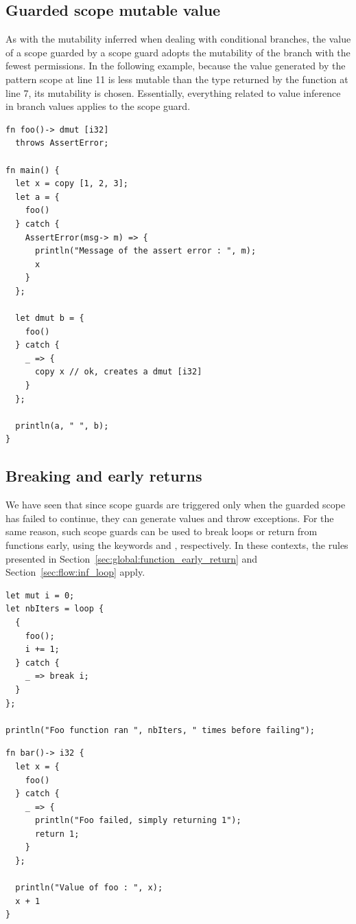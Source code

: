 \subsection{Guarded scope mutable value}

As with the mutability inferred when dealing with conditional branches, the
value of a scope guarded by a  scope guard adopts the mutability of
the branch with the fewest permissions. In the following example, because the
value generated by the  pattern scope at line 11 is less mutable
than the type returned by the function  at line 7, its mutability is
chosen. Essentially, everything related to value inference in branch values
applies to the  scope guard.

\begin{lstlisting}[style=coloredverbatim]
fn foo()-> dmut [i32]
  throws AssertError;

fn main() {
  let x = copy [1, 2, 3];
  let a = {
    foo()
  } catch {
    AssertError(msg-> m) => {
      println("Message of the assert error : ", m);
      x
    }
  };

  let dmut b = {
    foo()
  } catch {
    _ => {
      copy x // ok, creates a dmut [i32]
    }
  };

  println(a, " ", b);
}
\end{lstlisting}

\subsection{Breaking and early returns}

We have seen that since  scope guards are triggered only when the
guarded scope has failed to continue, they can generate values and throw
exceptions. For the same reason, such scope guards can be used to break loops or
return from functions early, using the keywords  and
, respectively. In these contexts, the rules presented in
Section~\ref{sec:global:function_early_return} and Section~\ref{sec:flow:inf_loop} apply.

\begin{lstlisting}[style=coloredverbatim]
let mut i = 0;
let nbIters = loop {
  {
    foo();
    i += 1;
  } catch {
    _ => break i;
  }
};

println("Foo function ran ", nbIters, " times before failing");
\end{lstlisting}

\begin{lstlisting}[style=coloredverbatim]
fn bar()-> i32 {
  let x = {
    foo()
  } catch {
    _ => {
      println("Foo failed, simply returning 1");
      return 1;
    }
  };

  println("Value of foo : ", x);
  x + 1
}
\end{lstlisting}

